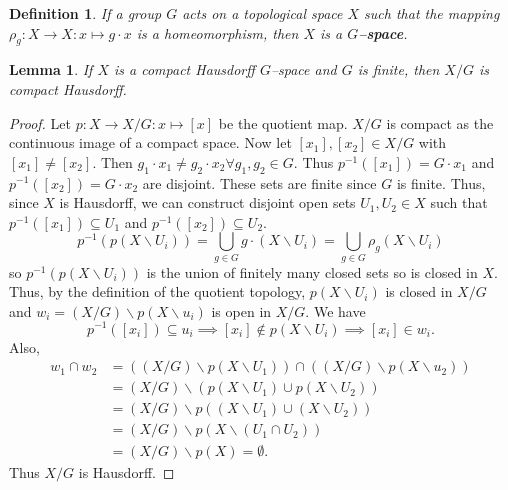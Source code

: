 \documentclass{article}
\newtheorem{definition}[theorem]{Definition}
\newtheorem{lemma}[theorem]{Lemma}
\begin{document}
\begin{definition}
If a group $G$ acts on a topological space $X$ such that the mapping $\rho_g:X\to X\colon x\mapsto g\cdot x$ is a homeomorphism, then $X$ is a \textbf{$G$--space}.
\end{definition}

\begin{lemma}
If $X$ is a compact Hausdorff $G$--space and $G$ is finite, then $X/G$ is compact Hausdorff.
\end{lemma}
\begin{proof}
Let $p:X\to X/G\colon x\mapsto[x]$ be the quotient map. $X/G$ is compact as the continuous image of a compact space. Now let $[x_1],[x_2]\in X/G$ with $[x_1]\neq [x_2]$. Then $g_1\cdot x_1\neq g_2\cdot x_2\forall g_1,g_2\in G$. Thus $p^{-1}([x_1])=G\cdot x_1$ and $p^{-1}([x_2])=G\cdot x_2$ are disjoint. These sets are finite since $G$ is finite. Thus, since $X$ is Hausdorff, we can construct disjoint open sets $U_1,U_2\in X$ such that $p^{-1}([x_1])\subseteq U_1$ and $p^{-1}([x_2])\subseteq U_2$. \[p^{-1}(p(X\backslash U_i))=\bigcup_{g\in G}g\cdot(X\backslash U_i)=\bigcup_{g\in G}\rho_g(X\backslash U_i)\] so $p^{-1}(p(X\backslash U_i))$ is the union of finitely many closed sets so is closed in $X$. Thus, by the definition of the quotient topology, $p(X\backslash U_i)$ is closed in $X/G$ and $w_i=(X/G)\backslash p(X\backslash u_i)$ is open in $X/G$. We have \[p^{-1}([x_i])\subseteq u_i\implies [x_i]\notin p(X\backslash U_i)\implies[x_i]\in w_i.\] Also, \begin{align*}w_1\cap w_2&=((X/G)\backslash p(X\backslash U_1))\cap((X/G)\backslash p(X\backslash u_2))\\&=(X/G)\backslash(p(X\backslash U_1)\cup p(X\backslash U_2))\\&=(X/G)\backslash p((X\backslash U_1)\cup (X\backslash U_2))\\&=(X/G)\backslash p(X\backslash(U_1\cap U_2))\\&=(X/G)\backslash p(X)=\emptyset.\end{align*} Thus $X/G$ is Hausdorff.
\end{proof}
\end{document}
